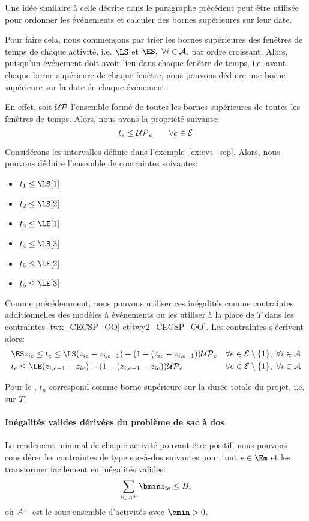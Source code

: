 Une idée similaire à celle décrite dans le paragraphe précédent peut
être utilisée pour ordonner les événements et calculer des bornes
supérieures sur leur date. 

Pour faire cela, nous commençons par trier les bornes supérieures des
fenêtres de temps de chaque activité, i.e. $\LS$ et $\ES,\ \forall i
\in \A$, par ordre croissant. Alors, puisqu'un événement doit avoir
lieu dans chaque fenêtre de temps, i.e. avant chaque borne supérieure de
chaque fenêtre, nous pouvons déduire une borne supérieure sur la date
de chaque événement.

En effet, soit ${\cal UP}$ l'ensemble formé de toutes les bornes
supérieures de toutes les fenêtres de temps. Alors, nous avons la
propriété suivante: 
\begin{equation} \label {Bte_CECSP_OO} t_e \le {\cal UP}_e \qquad
\forall e \in {\cal E}
\end{equation}

\begin{ex} 
Considérons les intervalles définie dans
l'exemple~\ref{ex:evt_sep}. Alors, nous pouvons déduire l'ensemble de
contraintes suivantes:

\begin{itemize}
\item $t_1 \le \LS[1]$
\item $t_2 \le \LS[2]$
\item $t_3 \le \LE[1]$
\item $t_4 \le \LS[3]$
\item $t_5 \le \LE[2]$
\item $t_6 \le \LE[3]$
\end{itemize}
\end{ex}

Comme précédemment, nous pouvons utiliser ces inégalités comme
contraintes additionnelles des modèles à événements ou les utiliser
à la place de  $T$ dans les contraintes \eqref{twx_CECSP_OO}
et\eqref{twy2_CECSP_OO}. Les contraintes s'écrivent alors: 
\begin{align*}
& \ES z_{ie}\le t_e \le \LS(z_{ie}-z_{i,e-1})+(1-(z_{ie}-z_{i,e-1})){\cal UP}_e 
 & & \forall e \in \E\setminus \{1\},\ \forall i \in {\cal
   A}\\
&t_e \le \LE(z_{i,e-1}-z_{ie})+(1-(z_{i,e-1}-z_{ie})){\cal UP}_e  & & \forall e
 \in \E\setminus \{1\},\ \forall i \in {\cal
   A}
\end{align*}

Pour le \RCPSP, $t_n$ correspond comme borne supérieure sur la durée
totale du projet, i.e. sur $T$.

\paragraph{Inégalités valides dérivées du problème de sac à dos}

Le rendement minimal de chaque activité pouvant être positif, nous
pouvons considérer les contraintes de type sac-à-dos suivantes pour
tout $e \in \Em$ et les transformer facilement en inégalités valides: 
\begin{equation}
\sum_{i\in \A^+} \bmin z_{ie} \leq B, 
\end{equation}
où ${\cal A}^+$ est le sous-ensemble d'activités avec $\bmin > 0$. 
